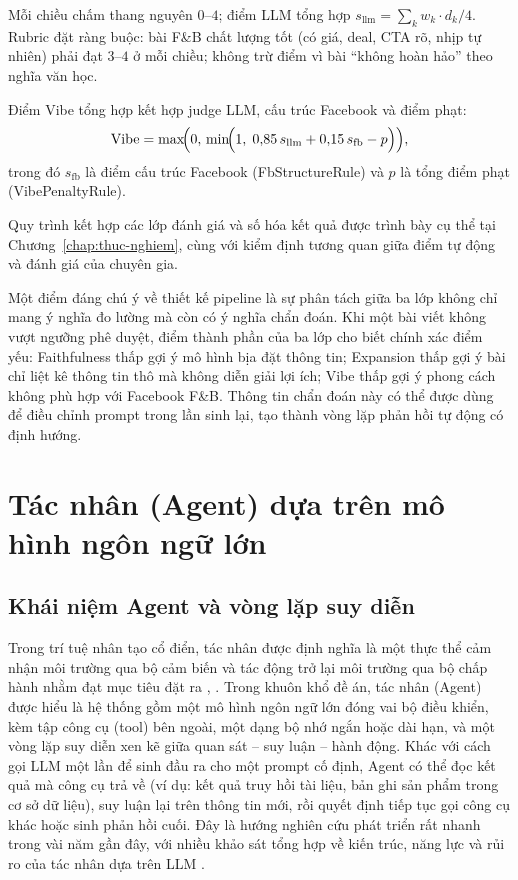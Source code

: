 Mỗi chiều chấm thang nguyên $0$--$4$; điểm LLM tổng
hợp $s_{\text{llm}} = \sum_{k} w_k \cdot d_k / 4$.
Rubric đặt ràng buộc: bài F\&B chất lượng tốt (có giá,
deal, CTA rõ, nhịp tự nhiên) phải đạt $3$--$4$ ở mỗi
chiều; không trừ điểm vì bài ``không hoàn hảo'' theo
nghĩa văn học.

Điểm Vibe tổng hợp kết hợp judge LLM, cấu trúc
Facebook và điểm phạt:
\begin{equation}
  \text{Vibe} = \max\!\Bigl(0,\,\min\!\Bigl(1,\;
  0{,}85\,s_{\text{llm}} + 0{,}15\,s_{\text{fb}}
  - p\Bigr)\Bigr),
  \label{eq:vibe-theory}
\end{equation}
trong đó $s_{\text{fb}}$ là điểm cấu trúc Facebook
(FbStructureRule) và $p$ là tổng điểm phạt
(VibePenaltyRule).

Quy trình kết hợp các lớp đánh giá và số hóa kết quả
được trình bày cụ thể tại Chương~\ref{chap:thuc-nghiem},
cùng với kiểm định tương quan giữa điểm tự động và đánh
giá của chuyên gia.

Một điểm đáng chú ý về thiết kế pipeline là sự phân tách giữa ba lớp
không chỉ mang ý nghĩa đo lường mà còn có ý nghĩa chẩn đoán. Khi một
bài viết không vượt ngưỡng phê duyệt, điểm thành phần của ba lớp cho
biết chính xác điểm yếu: Faithfulness thấp gợi ý mô hình bịa đặt thông
tin; Expansion thấp gợi ý bài chỉ liệt kê thông tin thô mà không diễn
giải lợi ích; Vibe thấp gợi ý phong cách không phù hợp với Facebook F\&B.
Thông tin chẩn đoán này có thể được dùng để điều chỉnh prompt trong lần
sinh lại, tạo thành vòng lặp phản hồi tự động có định hướng.

\section{Tác nhân (Agent) dựa trên mô hình ngôn ngữ lớn}\label{sec:agent}

\subsection{Khái niệm Agent và vòng lặp suy diễn}

Trong trí tuệ nhân tạo cổ điển, tác nhân được định nghĩa là
một thực thể cảm nhận môi trường qua bộ cảm biến và tác động
trở lại môi trường qua bộ chấp hành nhằm đạt mục tiêu đặt ra
, .
Trong khuôn khổ đề án, tác nhân (Agent) được hiểu là hệ
thống gồm một mô hình ngôn ngữ lớn đóng vai bộ điều khiển,
kèm tập công cụ (tool) bên ngoài, một dạng bộ nhớ ngắn hoặc
dài hạn, và một vòng lặp suy diễn xen kẽ giữa quan sát --
suy luận -- hành động. Khác với cách gọi LLM một lần để
sinh đầu ra cho một prompt cố định, Agent có thể đọc kết
quả mà công cụ trả về (ví dụ: kết quả truy hồi tài liệu,
bản ghi sản phẩm trong cơ sở dữ liệu), suy luận lại trên
thông tin mới, rồi quyết định tiếp tục gọi công cụ khác
hoặc sinh phản hồi cuối. Đây là hướng nghiên cứu phát
triển rất nhanh trong vài năm gần đây, với nhiều khảo
sát tổng hợp về kiến trúc, năng lực và rủi ro của tác
nhân dựa trên LLM .

